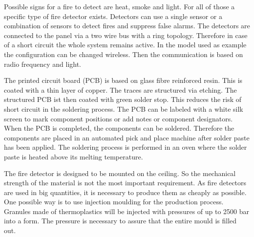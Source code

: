 Possible signs for a fire to detect are heat, smoke and light. For all of 
those a specific type of fire detector exists. Detectors can use a single 
sensor or a combination of sensors to detect fires and suppress false alarms. 
The detectors are connected to the panel via a two wire bus with a ring 
topology. Therefore in case of a short circuit the whole system remains 
active. In the model used as example the configuration can be changed wireless. 
Then the communication is based on radio frequency and light. 

The printed circuit board (PCB) is based on glass fibre reinforced resin. This 
is coated with a thin layer of copper. The traces are structured via etching. 
The structured PCB ist then coated with green solder stop. This reduces the 
risk of short circuit in the soldering process. The PCB can be labeled with a 
white silk screen to mark component positions or add notes or component 
designators. When the PCB is completed, the components can be soldered. 
Therefore the components are placed in an automated pick and place machine 
after solder paste has been applied. The soldering process is performed in 
an oven where the solder paste is heated above its melting temperature. 

The fire detector is designed to be mounted on the ceiling. So the mechanical 
strength of the material is not the most important requirement. As fire 
detectors are used in big quantities, it is necessary to produce them as 
cheaply as possible. One possible way is to use injection moulding for the 
production process. Granules made of thermoplastics will be injected with 
pressures of up to 2500 bar into a form. The pressure is necessary to assure 
that the entire mould is filled out.  
